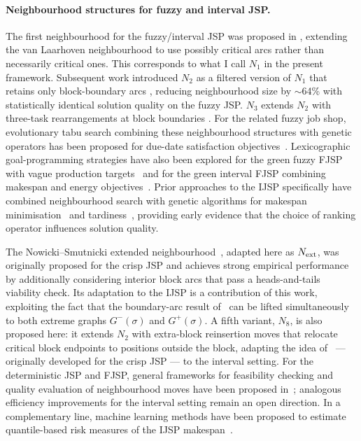\documentclass[preprint,12pt]{elsarticle}
\begin{document}
\paragraph{Neighbourhood structures for fuzzy and interval JSP.}
The first neighbourhood for the fuzzy/interval JSP was proposed in \cite{GonzalezRodriguez2008}, extending the van Laarhoven neighbourhood \cite{vanLaarhoven1992} to use possibly critical arcs rather than necessarily critical ones. This corresponds to what I call $N_1$ in the present framework. Subsequent work introduced $N_2$ as a filtered version of $N_1$ that retains only block-boundary arcs \cite{N2fjsp}, reducing neighbourhood size by $\sim$64\% with statistically identical solution quality on the fuzzy JSP. $N_3$ extends $N_2$ with three-task rearrangements at block boundaries \cite{N3fjsp}. For the related fuzzy job shop, evolutionary tabu search combining these neighbourhood structures with genetic operators has been proposed for due-date satisfaction objectives~\cite{Vela2020}. Lexicographic goal-programming strategies have also been explored for the green fuzzy FJSP with vague production targets~\cite{GarciaGomez2026Ann} and for the green interval FJSP combining makespan and energy objectives~\cite{Afsar2025}. Prior approaches to the IJSP specifically have combined neighbourhood search with genetic algorithms for makespan minimisation~\cite{DiazIPMU2020} and tardiness~\cite{DiazHAIS2020}, providing early evidence that the choice of ranking operator influences solution quality.

The Nowicki--Smutnicki extended neighbourhood~\cite{Nowicki2005}, adapted here as $N_{\rm ext}$, was originally proposed for the crisp JSP and achieves strong empirical performance by additionally considering interior block arcs that pass a heads-and-tails viability check. Its adaptation to the IJSP is a contribution of this work, exploiting the fact that the boundary-arc result of~\cite{Nowicki1996} can be lifted simultaneously to both extreme graphs $G^-(\sigma)$ and $G^+(\sigma)$. A fifth variant, $N_8$, is also proposed here: it extends $N_2$ with extra-block reinsertion moves that relocate critical block endpoints to positions outside the block, adapting the idea of~\cite{Xie2022} --- originally developed for the crisp JSP --- to the interval setting. For the deterministic JSP and FJSP, general frameworks for feasibility checking and quality evaluation of neighbourhood moves have been proposed in~\cite{Tamssaouet2023,GarciaGomez2026}; analogous efficiency improvements for the interval setting remain an open direction. In a complementary line, machine learning methods have been proposed to estimate quantile-based risk measures of the IJSP makespan~\cite{Calamita2025}.
\end{document}
